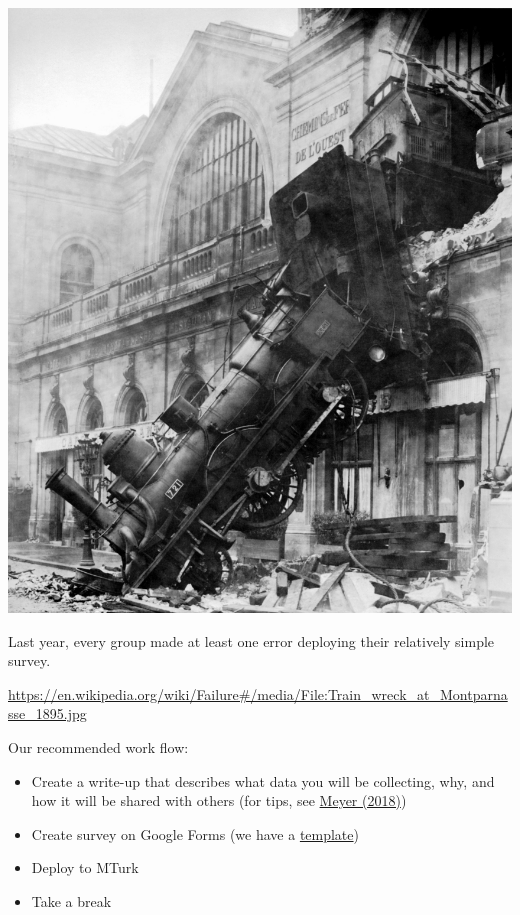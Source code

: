 \documentclass[aspectratio=169]{beamer}
\begin{document}
\begin{frame}

\begin{center}
\includegraphics[height=0.6\textheight]{figures/Train_wreck_at_Montparnasse_1895.jpg}
\end{center}

Last year, every group made at least one error deploying their relatively simple survey.

\vfill

{\tiny \url{https://en.wikipedia.org/wiki/Failure\#/media/File:Train_wreck_at_Montparnasse_1895.jpg}}
\end{frame}
\begin{frame}

Our recommended work flow:
\begin{itemize}
\item Create a write-up that describes what data you will be collecting, why, and how it will be shared with others (for tips, see \href{https://doi.org/10.1177/2515245917747656}{Meyer (2018)})
\item Create survey on Google Forms (we have a \href{https://github.com/compsocialscience/summer-institute/blob/master/2019/materials/day4-surveys/activity/2019-06-13_mturk_google_survey.pdf}{template})
\item Deploy to MTurk
\pause
\item Take a break
\end{itemize}

\end{frame}
\end{document}
